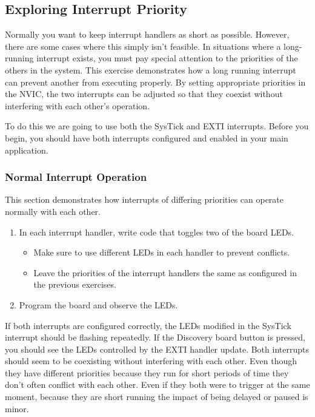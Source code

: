\documentclass[11pt,fleqn]{book} %
\begin{document}
\subsection{Exploring Interrupt Priority}
Normally you want to keep interrupt handlers as short as possible. However, there are some cases where this simply isn't feasible. In situations where a long-running interrupt exists, you must pay special attention to the priorities of the others in the system. This exercise demonstrates how a long running interrupt can prevent another from executing properly. By setting appropriate priorities in the NVIC, the two interrupts can be adjusted so that they coexist without interfering with each other's operation. 

To do this we are going to use both the SysTick and EXTI interrupts. Before you begin, you should have both interrupts configured and enabled in your main application.  

\subsubsection{Normal Interrupt Operation}

This section demonstrates how interrupts of differing priorities can operate normally with each other. 

\begin{enumerate}
    \item In each interrupt handler, write code that toggles two of the board LEDs.
    \begin{itemize}
        \item Make sure to use different LEDs in each handler to prevent conflicts.
        \item Leave the priorities of the interrupt handlers the same as configured in the previous exercises.
    \end{itemize}
    \item Program the board and observe the LEDs.
\end{enumerate}

 If both interrupts are configured correctly, the LEDs modified in the SysTick interrupt should be flashing repeatedly. If the Discovery board button is pressed, you should see the LEDs controlled by the EXTI handler update. Both interrupts should seem to be coexisting without interfering with each other. Even though they have different priorities because they run for short periods of time they don't often conflict with each other. Even if they both were to trigger at the same moment, because they are short running the impact of being delayed or paused is minor. 
\end{document}
